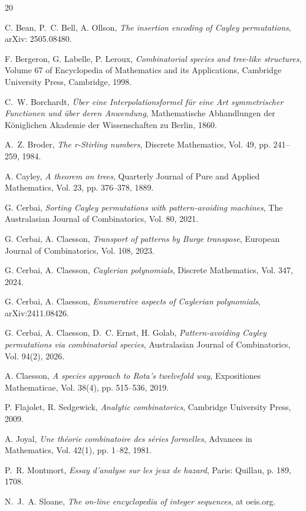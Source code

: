 \documentclass[a4paper,11pt,UKenglish]{article}
\theoremstyle{definition}
\begin{document}
\begin{thebibliography}{20}

 C. Bean, P.\ C. Bell, A. Ollson,
\emph{The insertion encoding of Cayley permutations},
arXiv: 2505.08480.

 F. Bergeron, G. Labelle, P. Leroux,
\emph{Combinatorial species and tree-like structures},
Volume 67 of Encyclopedia of Mathematics and its Applications,
Cambridge University Press, Cambridge, 1998.

 C.\ W. Borchardt,
\emph{Über eine Interpolationsformel für eine Art symmetrischer Functionen und über deren Anwendung},
Mathematische Abhandlungen der Königlichen Akademie der Wissenschaften zu Berlin, 1860.

 A.\ Z. Broder,
\emph{The r-Stirling numbers},
Discrete Mathematics, Vol. 49, pp. 241--259, 1984.

 A. Cayley,
\emph{A theorem on trees},
Quarterly Journal of Pure and Applied Mathematics, Vol. 23, pp. 376--378, 1889.

 G. Cerbai,
\emph{Sorting Cayley permutations with pattern-avoiding machines},
The Australasian Journal of Combinatorics, Vol. 80, 2021.

 G. Cerbai, A. Claesson,
\emph{Transport of patterns by Burge transpose},
European Journal of Combinatorics, Vol. 108, 2023.

 G. Cerbai, A. Claesson,
\emph{Caylerian polynomials},
Discrete Mathematics, Vol. 347, 2024.

 G. Cerbai, A. Claesson,
\emph{Enumerative aspects of Caylerian polynomials},
arXiv:2411.08426.

 G. Cerbai, A. Claesson, D.\ C. Ernst, H. Golab,
\emph{Pattern-avoiding Cayley permutations via combinatorial species},
Australasian Journal of Combinatorics, Vol. 94(2), 2026.

 A. Claesson,
\emph{A species approach to {R}ota's twelvefold way},
Expositiones Mathematicae, Vol. 38(4), pp. 515--536, 2019.

 P. Flajolet, R. Sedgewick,
\emph{Analytic combinatorics}, Cambridge University Press, 2009.

 A. Joyal,
\emph{Une théorie combinatoire des séries formelles},
Advances in Mathematics, Vol. 42(1), pp. 1--82, 1981.

 P.\ R. Montmort,
\emph{Essay d'analyse sur les jeux de hazard},
Paris: Quillau, p. 189, 1708.

 N.\ J.\ A. Sloane,
\emph{The on-line encyclopedia of integer sequences},
at oeis.org.

\end{thebibliography}
\end{document}
